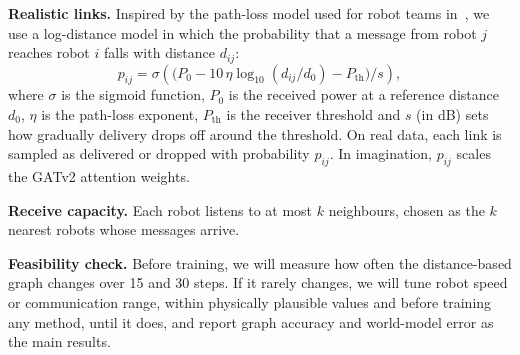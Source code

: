 \documentclass[conference]{IEEEtran}
\begin{document}
\textbf{Realistic links.} Inspired by the path-loss model used for robot teams in~\cite{tolstaya2021connectivity}, we use a log-distance model in which the probability that a message from robot $j$ reaches robot $i$ falls with distance $d_{ij}$:
\begin{equation}
p_{ij} = \sigma\!\left(\big(P_0-10\,\eta\log_{10}(d_{ij}/d_0)-P_{\mathrm{th}}\big)/s\right),
\end{equation}
where $\sigma$ is the sigmoid function, $P_0$ is the received power at a reference distance $d_0$, $\eta$ is the path-loss exponent, $P_{\mathrm{th}}$ is the receiver threshold and $s$ (in dB) sets how gradually delivery drops off around the threshold. On real data, each link is sampled as delivered or dropped with probability $p_{ij}$. In imagination, $p_{ij}$ scales the GATv2 attention weights.

\textbf{Receive capacity.} Each robot listens to at most $k$ neighbours, chosen as the $k$ nearest robots whose messages arrive.

\textbf{Feasibility check.} Before training, we will measure how often the distance-based graph changes over 15 and 30 steps. If it rarely changes, we will tune robot speed or communication range, within physically plausible values and before training any method, until it does, and report graph accuracy and world-model error as the main results.
\end{document}
